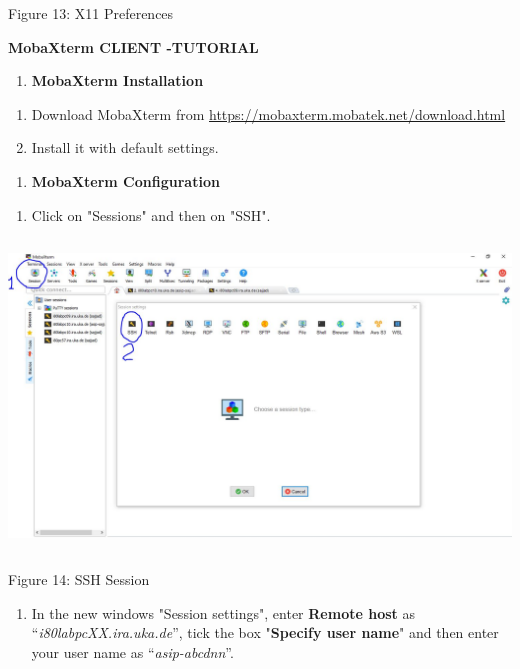 \documentclass{article}
\begin{document}
Figure 13: X11 Preferences

\textbf{\hfill\break
}

\textbf{MobaXterm CLIENT -TUTORIAL}

\begin{enumerate}
\def\labelenumi{\Alph{enumi}.}
\setcounter{enumi}{6}
\item
  \textbf{MobaXterm Installation}
\end{enumerate}

\begin{enumerate}
\def\labelenumi{\arabic{enumi}.}
\item
  Download MobaXterm from
  \url{https://mobaxterm.mobatek.net/download.html}
\item
  Install it with default settings.
\end{enumerate}

\begin{enumerate}
\def\labelenumi{\Alph{enumi}.}
\setcounter{enumi}{7}
\item
  \textbf{MobaXterm Configuration}
\end{enumerate}

\begin{enumerate}
\def\labelenumi{\arabic{enumi}.}
\setcounter{enumi}{2}
\item
  Click on "Sessions" and then on "SSH".
\end{enumerate}

\includegraphics[width=5.73515in,height=3.25226in]{images/media/image14.JPG}

Figure 14: SSH Session

\begin{enumerate}
\def\labelenumi{\arabic{enumi}.}
\setcounter{enumi}{3}
\item
  In the new windows "Session settings", enter \textbf{Remote host} as
  ``\emph{i80labpcXX.ira.uka.de}'', tick the box "\textbf{Specify user
  name}" and then enter your user name as ``\emph{asip-abcdnn}''.
\end{enumerate}
\end{document}
